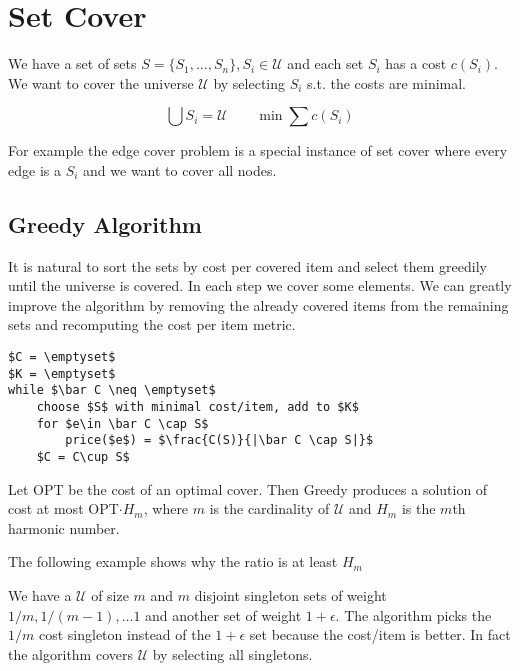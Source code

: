 \section{Set Cover}

We have a set of sets $S=\{S_1,\ldots,S_n\}, S_i\in \mathcal{U}$ and each set $S_i$ has a cost $c(S_i)$. We want to cover the universe $\mathcal{U}$ by selecting $S_i$ s.t. the costs are minimal.

\[\bigcup S_i = \mathcal{U}\qquad \min \sum c(S_i)\]

For example the edge cover problem is a special instance of set cover where every edge is a $S_i$ and we want to cover all nodes.

\subsection{Greedy Algorithm}

It is natural to sort the sets by cost per covered item and select them greedily until the universe is covered. In each step we cover some elements. We can greatly improve the algorithm by removing the already covered items from the remaining sets and recomputing the cost per item metric.

\begin{lstlisting}
$C = \emptyset$
$K = \emptyset$
while $\bar C \neq \emptyset$
	choose $S$ with minimal cost/item, add to $K$
	for $e\in \bar C \cap S$
		price($e$) = $\frac{C(S)}{|\bar C \cap S|}$ 
	$C = C\cup S$
\end{lstlisting}

\begin{thm} Let OPT be the cost of an optimal cover. Then Greedy produces a solution of cost at most OPT$\cdot H_m$, where $m$ is the cardinality of $\mathcal{U}$ and $H_m$ is the $m$th harmonic number.
\end{thm}

The following example shows why the ratio is at least $H_m$

\begin{Ex} We have a $\mathcal{U}$ of size $m$ and $m$ disjoint singleton sets of weight $1/m,1/(m-1),\ldots 1$ and another set of weight $1+\epsilon$. The algorithm picks the $1/m$ cost singleton instead of the $1+\epsilon$ set because the cost/item is better. In fact the algorithm covers $\mathcal{U}$ by selecting all singletons.
\end{Ex}


